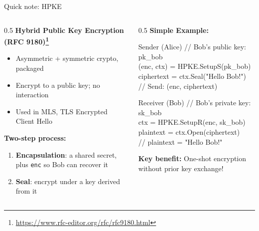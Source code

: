 \ifdefined\PRESENTATION\else\PassOptionsToClass{handout}{beamer}\fi\documentclass[aspectratio=169, lualatex]{beamer}
\begin{document}
\begin{frame}{Quick note: HPKE}
	\begin{columns}[c]
		\begin{column}{0.5\textwidth}
			\textbf{Hybrid Public Key Encryption (RFC 9180)\footnote{\url{https://www.rfc-editor.org/rfc/rfc9180.html}}}
			\begin{itemize}
				\item Asymmetric + symmetric crypto, packaged
				\item Encrypt to a public key; no interaction
				\item Used in MLS, TLS Encrypted Client Hello
			\end{itemize}
			\textbf{Two-step process:}
			\begin{enumerate}
				\item \textbf{Encapsulation}: a shared secret, plus \texttt{enc} so Bob can recover it
				\item \textbf{Seal}: encrypt under a key derived from it
			\end{enumerate}
		\end{column}
		\begin{column}{0.5\textwidth}
			\textbf{Simple Example:}
			\begin{exampleblock}{Sender (Alice)}
				\ttfamily\scriptsize
				// Bob's public key: pk\_bob\\
				(enc, ctx) = HPKE.SetupS(pk\_bob)\\
				ciphertext = ctx.Seal("Hello Bob!")\\
				// Send: (enc, ciphertext)
			\end{exampleblock}
			\begin{exampleblock}{Receiver (Bob)}
				\ttfamily\scriptsize
				// Bob's private key: sk\_bob\\
				ctx = HPKE.SetupR(enc, sk\_bob)\\
				plaintext = ctx.Open(ciphertext)\\
				// plaintext = "Hello Bob!"
			\end{exampleblock}
			\textbf{Key benefit:} One-shot encryption without prior key exchange!
		\end{column}
	\end{columns}
\end{frame}
\end{document}

